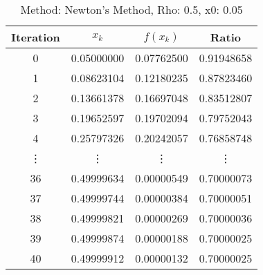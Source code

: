 \begin{table}
\centering
\caption{Method: Newton's Method, Rho: 0.5, x0: 0.05}
\label{tab:table_Newton's_Method_0_5_0_05}
\begin{tabular}{c c c c}
\toprule
Iteration &      $x_k$ &   $f(x_k)$ &      Ratio \\
\midrule
        0 & 0.05000000 & 0.07762500 & 0.91948658 \\
        1 & 0.08623104 & 0.12180235 & 0.87823460 \\
        2 & 0.13661378 & 0.16697048 & 0.83512807 \\
        3 & 0.19652597 & 0.19702094 & 0.79752043 \\
        4 & 0.25797326 & 0.20242057 & 0.76858748 \\
   \vdots &     \vdots &     \vdots &     \vdots \\
       36 & 0.49999634 & 0.00000549 & 0.70000073 \\
       37 & 0.49999744 & 0.00000384 & 0.70000051 \\
       38 & 0.49999821 & 0.00000269 & 0.70000036 \\
       39 & 0.49999874 & 0.00000188 & 0.70000025 \\
       40 & 0.49999912 & 0.00000132 & 0.70000025 \\
\bottomrule
\end{tabular}
\end{table}
